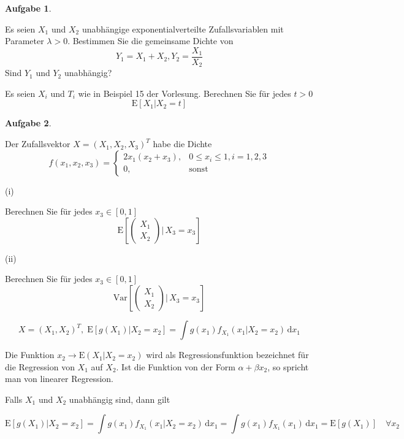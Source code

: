 \documentclass[12pt, a4paper]{article}
\newcommand{\E}{\mbox{I\negthinspace E}}
\theoremstyle{plain}
\theoremstyle{definition}
\newtheorem{aufgabe}{Aufgabe}
\newcommand{\1}{\mathds{1}}
\renewcommand{\E}{\mathrm{E}}
\newcommand{\Var}{\mathrm{Var}}
\renewcommand{\d}{\,\mathrm{d}}
\begin{document}
\begin{aufgabe} 
\end{aufgabe}

Es seien \(X_1\) und \(X_2\) unabhängige exponentialverteilte Zufallsvariablen mit Parameter \(\lambda > 0\). Bestimmen Sie die gemeinsame Dichte von
\[ Y_1 = X_1 + X_2 , Y_2 = \frac{X_1}{X_2} \]
Sind \(Y_1\) und \(Y_2\) unabhängig?



Es seien \(X_i\) und \(T_i\) wie in Beispiel 15 der Vorlesung. Berechnen Sie für jedes \(t>0\)
\[ \E[X_1 | X_2 = t] \]


\begin{aufgabe} 
\end{aufgabe}


Der Zufallsvektor \(X = (X_1, X_2, X_3)^T \) habe die Dichte
\[ f(x_1,x_2,x_3) = \begin{cases} 2x_1 (x_2+x_3), & 0 \le x_i \le 1, i=1,2,3 \\ 0, & \mbox{sonst} \end{cases} \]

   (i)

   Berechnen Sie für jedes \(x_3 \in [0,1]\)
   \[ \E \left[ \begin{pmatrix}X_1\\X_2\end{pmatrix} |\, X_3 = x_3 \right] \]

   (ii)

   Berechnen Sie für jedes \(x_3 \in [0,1]\)
   \[ \Var \left[ \begin{pmatrix}X_1\\X_2\end{pmatrix} |\, X_3 = x_3 \right] \]


\newpage


\[  X = (X_1, X_2)^T, \; \E[g(X_1) | X_2 = x_2] = \int g(x_1) f_{X_1} (x_1 |X_2 = x_2) \d x_1     \]

Die Funktion $ x_2 \to \E(X_1 | X_2 = x_2)$ wird als Regressionsfunktion bezeichnet für die Regression von $X_1$ auf $X_2$. Ist die Funktion von der Form $\alpha + \beta x_2$, so spricht man von linearer Regression.

Falls $X_1$ und $X_2$ unabhängig sind, dann gilt

\[   \E[g(X_1) | X_2 = x_2] = \int g(x_1) f_{X_1}(x_1 | X_2 = x_2) \d x_1 = \int g(x_1) f_{X_1} (x_1) \d x_1  = \E[g(X_1)] \quad \forall x_2      \]
\end{document}
